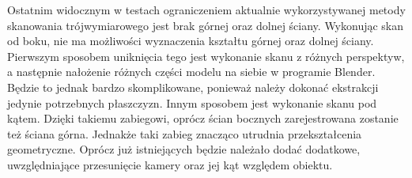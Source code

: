 Ostatnim widocznym w testach ograniczeniem aktualnie wykorzystywanej metody skanowania trójwymiarowego jest brak górnej oraz dolnej ściany. Wykonując skan od boku, nie ma możliwości wyznaczenia kształtu górnej oraz dolnej ściany. Pierwszym sposobem uniknięcia tego jest wykonanie skanu z różnych perspektyw, a następnie nałożenie różnych części modelu na siebie w programie Blender. Będzie to jednak bardzo skomplikowane, ponieważ należy dokonać ekstrakcji jedynie potrzebnych płaszczyzn. Innym sposobem jest wykonanie skanu pod kątem. Dzięki takiemu zabiegowi, oprócz ścian bocznych zarejestrowana zostanie też ściana górna. Jednakże  taki zabieg znacząco utrudnia przekształcenia geometryczne. Oprócz już istniejących będzie należało dodać dodatkowe, uwzględniające przesunięcie kamery oraz jej kąt względem obiektu.
\newpage



